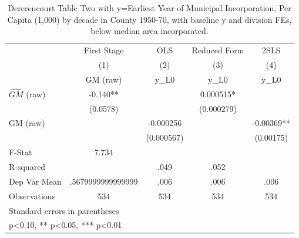 \begin{table}[htbp]\centering
\def\sym#1{\ifmmode^{#1}\else\(^{#1}\)\fi}
\caption{Dererencourt Table Two with y=Earliest Year of Municipal Incorporation, Per Capita (1,000) by decade in County 1950-70, with baseline y and division FEs, below median area incorporated.}
\begin{tabular}{l*{4}{c}}
\toprule
                    & First Stage   &         OLS   &Reduced Form   &        2SLS   \\
                    &\multicolumn{1}{c}{(1)}&\multicolumn{1}{c}{(2)}&\multicolumn{1}{c}{(3)}&\multicolumn{1}{c}{(4)}\\
                    &\multicolumn{1}{c}{GM  (raw)}&\multicolumn{1}{c}{y\_L0}&\multicolumn{1}{c}{y\_L0}&\multicolumn{1}{c}{y\_L0}\\
\midrule
$\hat{GM}$ (raw)    &      -0.140** &               &    0.000515*  &               \\
                    &    (0.0578)   &               &  (0.000279)   &               \\
\addlinespace
GM  (raw)           &               &   -0.000256   &               &    -0.00369** \\
                    &               &  (0.000567)   &               &   (0.00175)   \\
\midrule
F-Stat              &       7.734   &               &               &               \\
R-squared           &               &        .049   &        .052   &               \\
Dep Var Mean        &.5679999999999999   &        .006   &        .006   &        .006   \\
Observations        &         534   &         534   &         534   &         534   \\
\bottomrule
\multicolumn{5}{l}{\footnotesize Standard errors in parentheses}\\
\multicolumn{5}{l}{\footnotesize * p<0.10, ** p<0.05, *** p<0.01}\\
\end{tabular}
\end{table}
